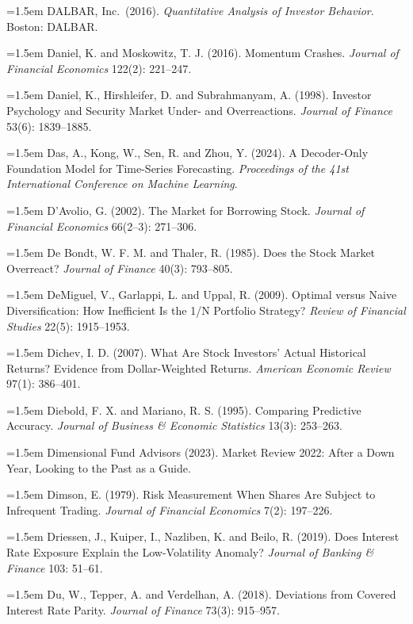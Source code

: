 \hangindent=1.5em DALBAR, Inc.\ (2016). \emph{Quantitative Analysis of Investor Behavior}. Boston: DALBAR.

\hangindent=1.5em Daniel, K. and Moskowitz, T. J. (2016). Momentum Crashes. \emph{Journal of Financial Economics} 122(2): 221--247.

\hangindent=1.5em Daniel, K., Hirshleifer, D. and Subrahmanyam, A. (1998). Investor Psychology and Security Market Under- and Overreactions. \emph{Journal of Finance} 53(6): 1839--1885.

\hangindent=1.5em Das, A., Kong, W., Sen, R. and Zhou, Y. (2024). A Decoder-Only Foundation Model for Time-Series Forecasting. \emph{Proceedings of the 41st International Conference on Machine Learning}.

\hangindent=1.5em D'Avolio, G. (2002). The Market for Borrowing Stock. \emph{Journal of Financial Economics} 66(2--3): 271--306.

\hangindent=1.5em De Bondt, W. F. M. and Thaler, R. (1985). Does the Stock Market Overreact? \emph{Journal of Finance} 40(3): 793--805.

\hangindent=1.5em DeMiguel, V., Garlappi, L. and Uppal, R. (2009). Optimal versus Naive Diversification: How Inefficient Is the 1/N Portfolio Strategy? \emph{Review of Financial Studies} 22(5): 1915--1953.

\hangindent=1.5em Dichev, I. D. (2007). What Are Stock Investors' Actual Historical Returns? Evidence from Dollar-Weighted Returns. \emph{American Economic Review} 97(1): 386--401.

\hangindent=1.5em Diebold, F. X. and Mariano, R. S. (1995). Comparing Predictive Accuracy. \emph{Journal of Business \& Economic Statistics} 13(3): 253--263.

\hangindent=1.5em Dimensional Fund Advisors (2023). Market Review 2022: After a Down Year, Looking to the Past as a Guide.

\hangindent=1.5em Dimson, E. (1979). Risk Measurement When Shares Are Subject to Infrequent Trading. \emph{Journal of Financial Economics} 7(2): 197--226.

\hangindent=1.5em Driessen, J., Kuiper, I., Nazliben, K. and Beilo, R. (2019). Does Interest Rate Exposure Explain the Low-Volatility Anomaly? \emph{Journal of Banking \& Finance} 103: 51--61.

\hangindent=1.5em Du, W., Tepper, A. and Verdelhan, A. (2018). Deviations from Covered Interest Rate Parity. \emph{Journal of Finance} 73(3): 915--957.

